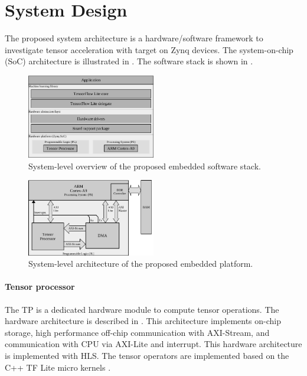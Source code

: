 \section{System Design}
\label{sec:system_design}
The proposed system architecture is a hardware/software framework to investigate tensor acceleration with target on Zynq devices. The system-on-chip (SoC) architecture is illustrated in . The software stack is shown in .

\begin{figure}[t!]
	\centering
	\includegraphics[width=0.5\textwidth]{../figures/sw_stack.pdf}
	\caption{System-level overview of the proposed embedded software stack.}
	\label{fig:sw_stack}
\end{figure}

\begin{figure}[t!]
	\centering
	\includegraphics[width=0.5\textwidth]{../figures/system_design.pdf}
	\caption{System-level architecture of the proposed embedded platform.}
	\label{fig:system_architecture}
\end{figure}

\paragraph{Tensor processor}
The TP is a dedicated hardware module to compute tensor operations. The hardware architecture is described in . This architecture implements on-chip storage, high performance off-chip communication with AXI-Stream, and communication with CPU via AXI-Lite and interrupt. This hardware architecture is implemented with HLS. The tensor operators are implemented based on the C++ TF Lite micro kernels \cite{tfLiteMicro}.

